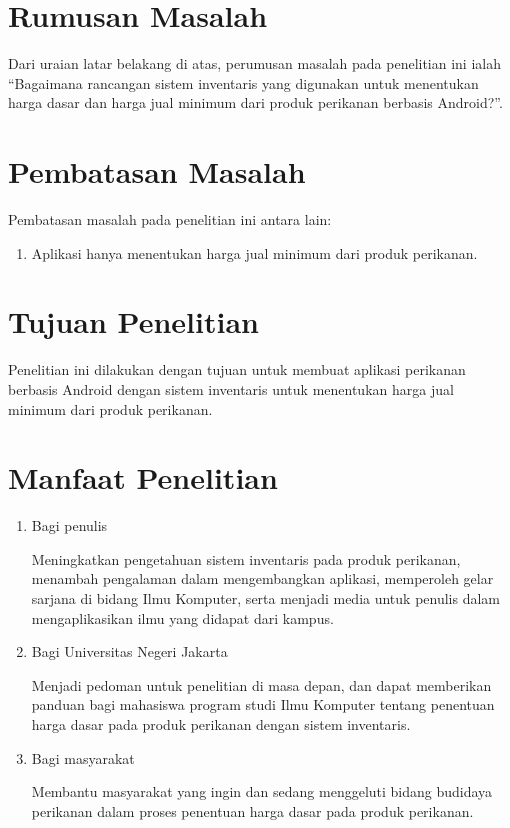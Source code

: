 \begin{spacing}{1.5}
\section{Rumusan Masalah}
Dari uraian latar belakang di atas, perumusan masalah pada penelitian ini ialah “Bagaimana rancangan sistem inventaris yang digunakan untuk menentukan harga dasar dan harga jual minimum dari produk perikanan berbasis Android?”.

\section{Pembatasan Masalah}
Pembatasan masalah pada penelitian ini antara lain:
\begin{enumerate}
	\item Aplikasi hanya menentukan harga jual minimum dari produk perikanan.
\end{enumerate}

\section{Tujuan Penelitian}
	Penelitian ini dilakukan dengan tujuan untuk membuat aplikasi perikanan berbasis Android dengan sistem inventaris untuk menentukan harga jual minimum dari produk perikanan.

\section{Manfaat Penelitian}
\begin{enumerate}
	\item Bagi penulis
		
	Meningkatkan pengetahuan sistem inventaris pada produk perikanan, menambah pengalaman dalam mengembangkan aplikasi, memperoleh gelar sarjana di bidang Ilmu Komputer, serta menjadi media untuk penulis dalam mengaplikasikan ilmu yang didapat dari kampus.
		
	\item Bagi Universitas Negeri Jakarta
	 	
	Menjadi pedoman untuk penelitian di masa depan, dan dapat memberikan panduan bagi mahasiswa program studi Ilmu Komputer tentang penentuan harga dasar pada produk perikanan dengan sistem inventaris.
	
	\item Bagi masyarakat
	 	
	Membantu masyarakat yang ingin dan sedang menggeluti bidang budidaya perikanan dalam proses penentuan harga dasar pada produk perikanan.
	 			
\end{enumerate}


\begin{comment}

\end{comment}

\end{spacing}